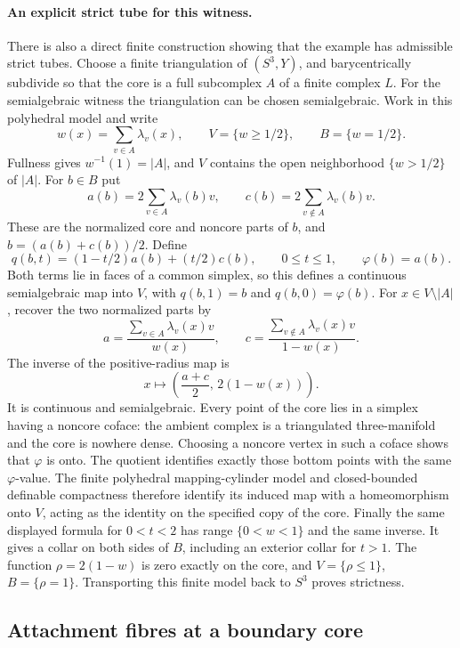 \paragraph{An explicit strict tube for this witness.}
There is also a direct finite construction showing that the example
has admissible strict tubes.
Choose a finite triangulation of $(S^3,Y)$, and barycentrically
subdivide so that the core is a full subcomplex $A$ of a finite
complex $L$.  For the semialgebraic witness the triangulation can
be chosen semialgebraic.  Work in this polyhedral model and write
\[
 w(x)=\sum_{v\in A}\lambda_v(x),\qquad
 V=\{w\geq1/2\},\qquad B=\{w=1/2\}.
\]
Fullness gives $w^{-1}(1)=|A|$, and $V$ contains the open
neighborhood $\{w>1/2\}$ of $|A|$.
For $b\in B$ put
\[
 a(b)=2\sum_{v\in A}\lambda_v(b)v,
 \qquad
 c(b)=2\sum_{v\notin A}\lambda_v(b)v.
\]
These are the normalized core and noncore parts of $b$, and
$b=(a(b)+c(b))/2$.
Define
\[
 q(b,t)=(1-t/2)a(b)+(t/2)c(b),\qquad 0\leq t\leq1,
 \qquad \varphi(b)=a(b).
\]
Both terms lie in faces of a common simplex, so this defines a
continuous semialgebraic map into $V$, with $q(b,1)=b$ and
$q(b,0)=\varphi(b)$.
For $x\in V\setminus|A|$, recover the two normalized parts by
\[
 a=\frac{\sum_{v\in A}\lambda_v(x)v}{w(x)},\qquad
 c=\frac{\sum_{v\notin A}\lambda_v(x)v}{1-w(x)}.
\]
The inverse of the positive-radius map is
\[
 x\longmapsto\left(\frac{a+c}{2},\,2(1-w(x))\right).
\]
It is continuous and semialgebraic.
Every point of the core lies in a simplex having a noncore coface:
the ambient complex is a triangulated three-manifold and the core
is nowhere dense.  Choosing a noncore vertex in such a coface
shows that $\varphi$ is onto.
The quotient identifies exactly those bottom points with the same
$\varphi$-value.  The finite polyhedral mapping-cylinder model and
closed-bounded definable compactness therefore identify its induced
map with a homeomorphism onto $V$, acting as the identity on the
specified copy of the core.
Finally the same displayed formula for $0<t<2$ has range
$\{0<w<1\}$ and the same inverse.
It gives a collar on both sides of $B$, including an exterior
collar for $t>1$.  The function $\rho=2(1-w)$ is zero exactly on
the core, and $V=\{\rho\leq1\}$, $B=\{\rho=1\}$.
Transporting this finite model back to $S^3$ proves strictness.


\subsection{Attachment fibres at a boundary core}


